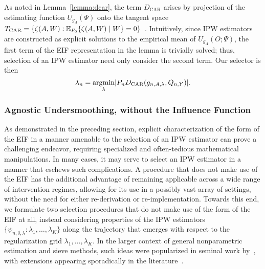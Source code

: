 As noted in Lemma~\ref{lemma:dcar}, the term $D_{\text{CAR}}$ arises by
projection of the estimating function $U_{g_A}(\Psi)$ onto the tangent space
$T_{\text{CAR}} = \{\zeta(A,W): \mathbb{E}_{P_0} \{\zeta(A,W) \mid W \} =
0\}$~\citep{robins1994estimation,vdl2003unified}. Intuitively, since
IPW estimators are constructed as explicit solutions to the empirical mean of
$U_{g_A}(O; \Psi)$, the first term of the EIF representation in the lemma is
trivially solved; thus, selection of an IPW estimator need only consider the
second term. Our selector is then
\begin{equation*}
  \lambda_n = \operatorname*{\arg\!\min}_{\lambda} \lvert P_n D_{\text{CAR}}(g_{n,A,\lambda},
    Q_{n,Y}) \rvert .
\end{equation*}

\subsubsection{Agnostic Undersmoothing, without the Influence Function}

As demonstrated in the preceding section, explicit characterization of the form
of the EIF in a manner amenable to the selection of an IPW estimator can prove
a challenging endeavor, requiring specialized and often-tedious mathematical
manipulations. In many cases, it may serve to select an IPW estimator in
a manner that eschews such complications. A procedure that does not make use of
the EIF has the additional advantage of remaining applicable across a wide range
of intervention regimes, allowing for its use in a possibly vast array of
settings, without the need for either re-derivation or re-implementation.
Towards this end, we formulate two selection procedures that do not make use of
the form of the EIF at all, instead considering properties of the IPW estimators
$\{\psi_{n,\delta,\lambda}: \lambda_1, \ldots, \lambda_K \}$ along the
trajectory that emerges with respect to the regularization grid $\lambda_1,
\ldots, \lambda_K$. In the larger context of general nonparametric estimation
and sieve methods, such ideas were popularized in seminal work
by~\citet{lepskii1991problem,lepskii1992asymptotically}, with extensions
appearing sporadically in the literature~\citep[e.g.,][]{lepskii1997optimal,
birge2001alternative}.

